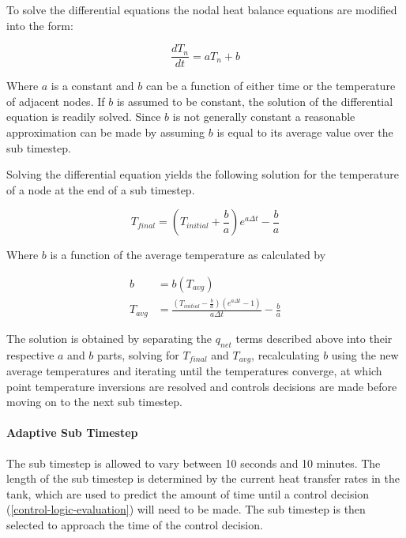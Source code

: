 To solve the differential equations the nodal heat balance equations are modified into the form:

\begin{equation}\label{strat-tank-diffeq}
  \frac{d{T_n}}{dt} = a T_n + b
\end{equation}

Where $a$ is a constant and $b$ can be a function of either time or the temperature of adjacent nodes. If $b$ is assumed to be constant, the solution of the differential equation is readily solved. Since $b$ is not generally constant a reasonable approximation can be made by assuming $b$ is equal to its average value over the sub timestep.

Solving the differential equation yields the following solution for the temperature of a node at the end of a sub timestep.

\begin{equation}
  T_{final} = \left( T_{initial} + \frac{b}{a} \right) e ^ {a \Delta t} - \frac{b}{a}
\end{equation}

Where $b$ is a function of the average temperature as calculated by

\begin{equation}
  \begin{array}{rl}
    b &= b(T_{avg}) \\
    T_{avg} &= \frac{(T_{initial} - \frac{b}{a}) (e ^ {a \Delta t} - 1)}{a \Delta t} - \frac{b}{a}
  \end{array}
\end{equation}

The solution is obtained by separating the $q_{net}$ terms described above into their respective $a$ and $b$ parts, solving for $T_{final}$ and $T_{avg}$, recalculating $b$ using the new average temperatures and iterating until the temperatures converge, at which point temperature inversions are resolved and controls decisions are made before moving on to the next sub timestep.

\paragraph{Adaptive Sub Timestep}

The sub timestep is allowed to vary between 10 seconds and 10 minutes. The length of the sub timestep is determined by the current heat transfer rates in the tank, which are used to predict the amount of time until a control decision (\ref{control-logic-evaluation}) will need to be made. The sub timestep is then selected to approach the time of the control decision.

